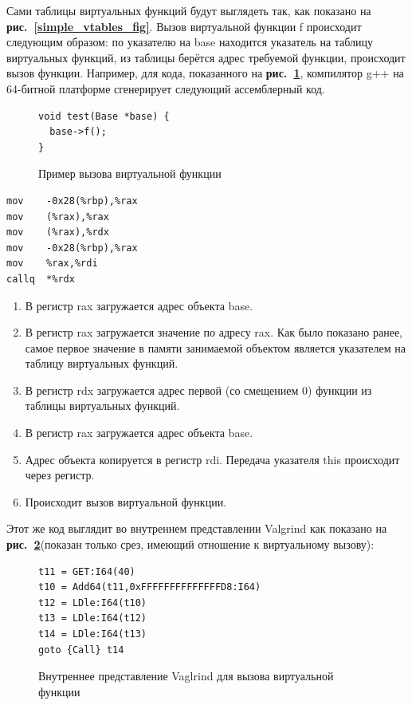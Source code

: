 \documentclass[a4paper,12pt,russian]{article}
\newcommand{\picref}[1]{\textbf{рис.~\ref{#1}}}
\newcommand{\code}[1]{\textsf{#1}}
\begin{document}
Сами таблицы виртуальных функций будут выглядеть так, как показано на \picref{simple_vtables_fig}.
Вызов виртуальной функции \code{f} происходит следующим образом: по указателю на \code{base} находится указатель на таблицу виртуальных функций, из таблицы берётся адрес требуемой функции, происходит вызов функции.
Например, для кода, показанного на \picref{virtual_call_lst}, компилятор g++ на 64-битной платформе сгенерирует следующий ассемблерный код.
\begin{figure}
\begin{lstlisting}
void test(Base *base) {
  base->f();
}
\end{lstlisting}
\caption{Пример вызова виртуальной функции}
\label{virtual_call_lst}
\end{figure}

\begin{minipage}[b]{\linewidth}
\vspace{0.5cm}
\begin{minipage}[t]{0.40\linewidth}
\begin{lstlisting}[language={[x86masm]Assembler}]
mov    -0x28(%rbp),%rax
mov    (%rax),%rax
mov    (%rax),%rdx
mov    -0x28(%rbp),%rax
mov    %rax,%rdi
callq  *%rdx
\end{lstlisting}
\end{minipage}
\vline
\begin{minipage}[t]{0.45\linewidth}
\begin{enumerate}
\item В регистр \code{rax} загружается адрес объекта \code{base}.
\item В регистр \code{rax} загружается значение по адресу \code{rax}. Как было показано ранее, самое первое значение в памяти занимаемой объектом является указателем на таблицу виртуальных функций.
\item В регистр \code{rdx} загружается адрес первой (со смещением $0$) функции из таблицы виртуальных функций.
\item В регистр \code{rax} загружается адрес объекта \code{base}.
\item Адрес объекта копируется в регистр \code{rdi}. Передача указателя \code{this} происходит через регистр.
\item Происходит вызов виртуальной функции.
\end{enumerate}
\end{minipage}
\vspace{0.5cm}
\end{minipage}

Этот же код выглядит во внутреннем представлении \code{Valgrind} как показано на \picref{vcall_valgrind_lst}(показан только срез, имеющий отношение к виртуальному вызову):
\begin{figure}
\begin{lstlisting}
t11 = GET:I64(40)
t10 = Add64(t11,0xFFFFFFFFFFFFFFD8:I64)
t12 = LDle:I64(t10)
t13 = LDle:I64(t12)
t14 = LDle:I64(t13)
goto {Call} t14
\end{lstlisting}
\caption{Внутреннее представление \code{Vaglrind} для вызова виртуальной функции}
\label{vcall_valgrind_lst}
\end{figure}
\end{document}
